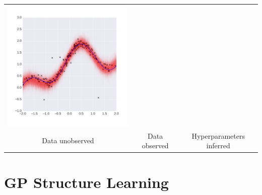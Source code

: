 \documentclass[a0,portrait]{a0poster}
\begin{document}
\begin{multicols}{3}
\begin{center}
\begin{tabular}{ccc}
  \includegraphics[width=8cm]{neal_se_3final.png}\\
  Data unobserved &
  Data observed &
  Hyperparameters inferred
\end{tabular}
\end{center}



%


\section*{GP Structure Learning}


\end{multicols}
\end{document}
